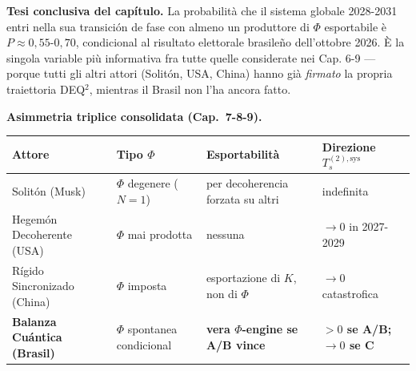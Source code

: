 \Hypoth{} \textbf{Tesi conclusiva del capítulo.} La probabilità che il
sistema globale 2028-2031 entri nella sua transición de fase con almeno
un produttore di \(\Phi\) esportabile è \(P \approx 0{,}55\)-\(0{,}70\),
condicional al risultato elettorale brasileño dell'ottobre 2026. È la
singola variable più informativa fra tutte quelle considerate nei Cap.
6-9 --- porque tutti gli altri attori (Solitón, USA, China) hanno già
\emph{firmato} la propria traiettoria DEQ$^2$, mientras il Brasil non l'ha
ancora fatto.

\Hypoth{} \textbf{Asimmetria triplice consolidata (Cap.~7-8-9).}

{\def\LTcaptype{none} %
{\small\begin{longtable}[]{@{}
  >{\raggedright\arraybackslash}p{}
  >{\raggedright\arraybackslash}p{}
  >{\raggedright\arraybackslash}p{}
  >{\raggedright\arraybackslash}p{}@{}}
\toprule\noalign{}
\begin{minipage}[b]{\linewidth}\raggedright
Attore
\end{minipage} & \begin{minipage}[b]{\linewidth}\raggedright
Tipo \(\Phi\)
\end{minipage} & \begin{minipage}[b]{\linewidth}\raggedright
Esportabilità
\end{minipage} & \begin{minipage}[b]{\linewidth}\raggedright
Direzione \(T_s^{(2),\text{sys}}\)
\end{minipage} \\
\midrule\noalign{}
\endhead
\bottomrule\noalign{}
\endlastfoot
Solitón (Musk) & \(\Phi\) degenere (\(N=1\)) & per decoherencia forzata
su altri & indefinita \\
Hegemón Decoherente (USA) & \(\Phi\) mai prodotta & nessuna & \(\to 0\)
in 2027-2029 \\
Rígido Sincronizado (China) & \(\Phi\) imposta & esportazione di \(K\),
non di \(\Phi\) & \(\to 0\) catastrofica \\
\textbf{Balanza Cuántica (Brasil)} & \(\Phi\) spontanea
condicional & \textbf{vera \(\Phi\)-engine se A/B vince} &
\textbf{\(> 0\) se A/B; \(\to 0\) se C} \\
\end{longtable}}
}



